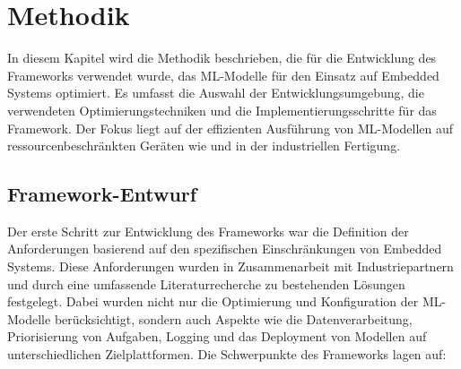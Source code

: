 \chapter{Methodik}
\label{chap:methodik}

In diesem Kapitel wird die Methodik beschrieben, die für die Entwicklung des Frameworks verwendet wurde, das ML-Modelle für den Einsatz auf Embedded Systems optimiert. 
Es umfasst die Auswahl der Entwicklungsumgebung, die verwendeten Optimierungstechniken und die Implementierungsschritte für das Framework. Der Fokus liegt auf der 
effizienten Ausführung von ML-Modellen auf ressourcenbeschränkten Geräten wie \SPS und \IPC in der industriellen Fertigung.

\section{Framework-Entwurf}

Der erste Schritt zur Entwicklung des Frameworks war die Definition der Anforderungen basierend auf den spezifischen Einschränkungen von Embedded Systems. 
Diese Anforderungen wurden in Zusammenarbeit mit Industriepartnern und durch eine umfassende Literaturrecherche zu bestehenden Lösungen festgelegt. 
Dabei wurden nicht nur die Optimierung und Konfiguration der ML-Modelle berücksichtigt, sondern auch Aspekte wie die Datenverarbeitung, Priorisierung von Aufgaben, 
Logging und das Deployment von Modellen auf unterschiedlichen Zielplattformen. Die Schwerpunkte des Frameworks lagen auf:

